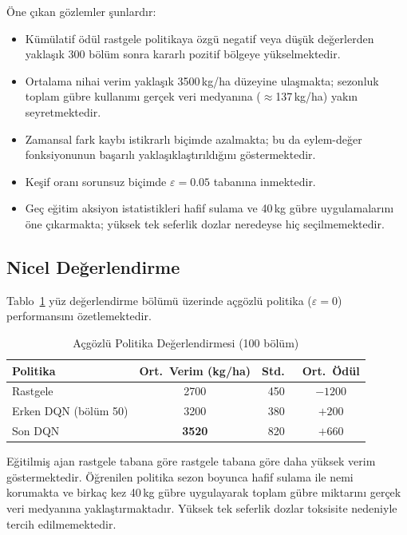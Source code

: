 \documentclass[10pt,twocolumn,a4paper]{article}
\begin{document}
\"One \c{c}{\i}kan g\"ozlemler \c{s}unlard{\i}r:
\begin{itemize}
    \item K\"um\"ulatif \"od\"ul rastgele politikaya \"ozg\"u negatif veya d\"u\c{s}\"uk de\u{g}erlerden yakla\c{s}{\i}k 300 b\"ol\"um sonra kararl{\i} pozitif b\"olgeye y\"ukselmektedir.
    \item Ortalama nihai verim yakla\c{s}{\i}k 3500\,kg/ha d\"uzeyine ula\c{s}makta; sezonluk toplam g\"ubre kullan{\i}m{\i} ger\c{c}ek veri medyan{\i}na ($\approx$137\,kg/ha) yak{\i}n seyretmektedir.
    \item Zamansal fark kayb{\i} istikrarl{\i} bi\c{c}imde azalmakta; bu da eylem-de\u{g}er fonksiyonunun ba\c{s}ar{\i}l{\i} yakla\c{s}{\i}kla\c{s}t{\i}r{\i}ld{\i}\u{g}{\i}n{\i} g\"ostermektedir.
    \item Ke\c{s}if oran{\i} sorunsuz bi\c{c}imde $\varepsilon=0.05$ taban{\i}na inmektedir.
    \item Ge\c{c} e\u{g}itim aksiyon istatistikleri hafif sulama ve 40\,kg g\"ubre uygulamalar{\i}n{\i} \"one \c{c}{\i}karmakta; y\"uksek tek seferlik dozlar neredeyse hi\c{c} se\c{c}ilmemektedir.
\end{itemize}

\subsection{Nicel De\u{g}erlendirme}
Tablo~\ref{tab:eval} y\"uz de\u{g}erlendirme b\"ol\"um\"u \"uzerinde a\c{c}g\"ozl\"u politika ($\varepsilon=0$) performans{\i}n{\i} \"ozetlemektedir.

\begin{table}[H]
\centering
\caption{A\c{c}g\"ozl\"u Politika De\u{g}erlendirmesi (100 b\"ol\"um)}
\label{tab:eval}
\small
\begin{tabular}{@{}lccc@{}}
\toprule
Politika & Ort.\ Verim (kg/ha) & Std.\ & Ort.\ \"Od\"ul \\
\midrule
Rastgele & 2700 & 450 & $-1200$ \\
Erken DQN (b\"ol\"um 50) & 3200 & 380 & $+200$ \\
Son DQN & \textbf{3520} & 820 & \textbf{$+660$} \\
\bottomrule
\end{tabular}
\end{table}

E\u{g}itilmi\c{s} ajan rastgele tabana g\"ore rastgele tabana g\"ore daha y\"uksek verim g\"ostermektedir. \"O\u{g}renilen politika sezon boyunca hafif sulama ile nemi korumakta ve birka\c{c} kez 40\,kg g\"ubre uygulayarak toplam g\"ubre miktar{\i}n{\i} ger\c{c}ek veri medyan{\i}na yakla\c{s}t{\i}rmaktad{\i}r. Y\"uksek tek seferlik dozlar toksisite nedeniyle tercih edilmemektedir.
\end{document}

